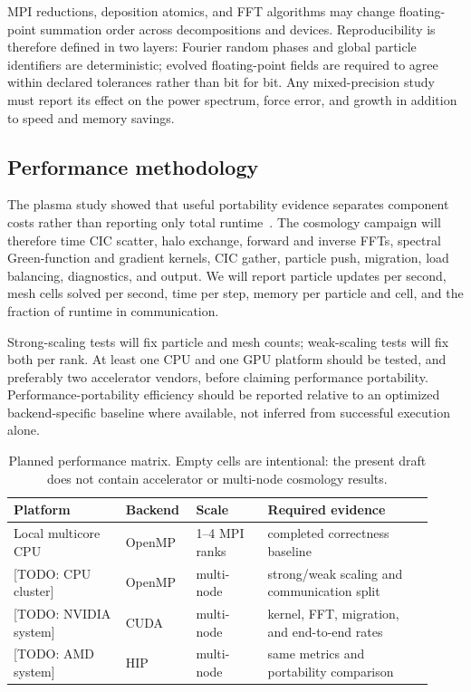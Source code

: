 \documentclass[11pt]{article}
\newcommand{\todo}[1]{\textcolor{red!70!black}{[TODO: #1]}}
\begin{document}
MPI reductions, deposition atomics, and FFT algorithms may change floating-point
summation order across decompositions and devices.  Reproducibility is therefore
defined in two layers: Fourier random phases and global particle identifiers are
deterministic; evolved floating-point fields are required to agree within
declared tolerances rather than bit for bit.  Any mixed-precision study must
report its effect on the power spectrum, force error, and growth in addition to
speed and memory savings.

\subsection{Performance methodology}

The plasma study showed that useful portability evidence separates component
costs rather than reporting only total runtime~\cite{muralikrishnan2024scaling}.
The cosmology campaign will therefore time CIC scatter, halo exchange, forward
and inverse FFTs, spectral Green-function and gradient kernels, CIC gather,
particle push, migration, load balancing, diagnostics, and output.  We will
report particle updates per second, mesh cells solved per second, time per step,
memory per particle and cell, and the fraction of runtime in communication.

Strong-scaling tests will fix particle and mesh counts; weak-scaling tests will
fix both per rank.  At least one CPU and one GPU platform should be tested, and
preferably two accelerator vendors, before claiming performance portability.
Performance-portability efficiency should be reported relative to an optimized
backend-specific baseline where available, not inferred from successful
execution alone.

\begin{table}[htbp]
  \centering
  \caption{Planned performance matrix.  Empty cells are intentional: the
  present draft does not contain accelerator or multi-node cosmology results.}
  \label{tab:performance-plan}
  \begin{tabular}{@{}p{0.25\linewidth}p{0.14\linewidth}p{0.16\linewidth}p{0.37\linewidth}@{}}
    \toprule
    Platform & Backend & Scale & Required evidence \\
    \midrule
    Local multicore CPU & OpenMP & 1--4 MPI ranks & completed correctness baseline \\
    \todo{CPU cluster} & OpenMP & multi-node & strong/weak scaling and communication split \\
    \todo{NVIDIA system} & CUDA & multi-node & kernel, FFT, migration, and end-to-end rates \\
    \todo{AMD system} & HIP & multi-node & same metrics and portability comparison \\
    \bottomrule
  \end{tabular}
\end{table}
\end{document}

